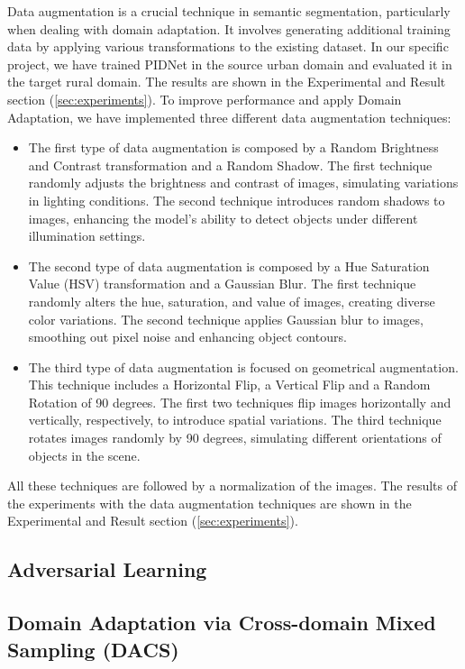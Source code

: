 \documentclass[10pt,twocolumn,letterpaper]{article}
\begin{document}
Data augmentation is a crucial technique in semantic segmentation, particularly when dealing with domain adaptation. It involves generating additional training data by applying various transformations to the existing dataset. In our specific project, we have trained PIDNet in the source urban domain and evaluated it in the target rural domain. The results are shown in the Experimental and Result section (\ref{sec:experiments}). 
To improve performance and apply Domain Adaptation, we have implemented three different data augmentation techniques:
\begin{itemize}
    \item The first type of data augmentation is composed by a Random Brightness and Contrast transformation and a Random Shadow. The first technique randomly adjusts the brightness and contrast of images, simulating variations in lighting conditions. The second technique introduces random shadows to images, enhancing the model’s ability to detect objects under different illumination settings. 
    \item The second type of data augmentation is composed by a Hue Saturation Value (HSV) transformation and a Gaussian Blur. The first technique randomly alters the hue, saturation, and value of images, creating diverse color variations. The second technique applies Gaussian blur to images, smoothing out pixel noise and enhancing object contours.
    \item The third type of data augmentation is focused on geometrical augmentation. This technique includes a Horizontal Flip, a Vertical Flip and a Random Rotation of 90 degrees. The first two techniques flip images horizontally and vertically, respectively, to introduce spatial variations. The third technique rotates images randomly by 90 degrees, simulating different orientations of objects in the scene.
\end{itemize}

All these techniques are followed by a normalization of the images. The results of the experiments with the data augmentation techniques are shown in the Experimental and Result section (\ref{sec:experiments}).

\subsection{Adversarial Learning}

\subsection{Domain Adaptation via Cross-domain Mixed Sampling (DACS)}
\end{document}
